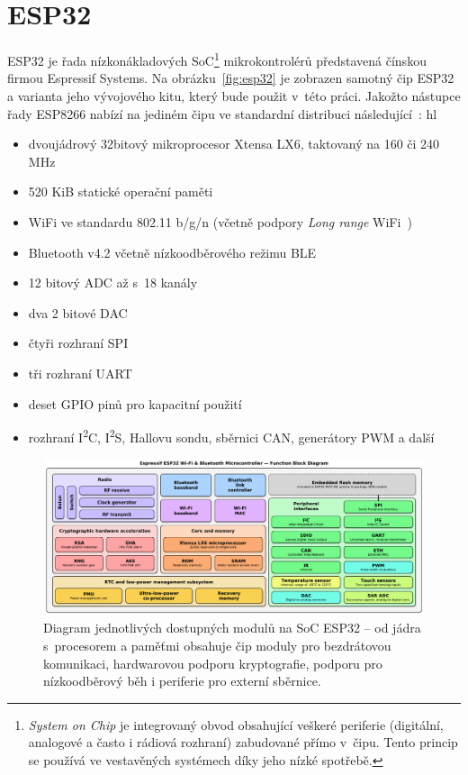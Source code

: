 \section{ESP32}\label{sec:esp32}
ESP32 je řada nízkonákladových SoC\footnote{\textit{System on Chip} je integrovaný obvod obsahující veškeré
periferie (digitální, analogové a často i rádiová rozhraní) zabudované přímo v~čipu.
Tento princip se používá ve vestavěných systémech díky jeho nízké spotřebě.} mikrokontrolérů představená čínskou
firmou Espressif Systems.
Na obrázku~\ref{fig:esp32} je zobrazen samotný čip ESP32 a varianta jeho vývojového kitu, který bude použit v~této
práci.
Jakožto nástupce řady ESP8266 nabízí na jediném čipu ve standardní distribuci následující~\cite{ESP32Datasheet}:
hl
\begin{itemize}
    \item dvoujádrový 32bitový mikroprocesor Xtensa LX6, taktovaný na 160 či 240 MHz
    \item 520 KiB statické operační paměti
    \item WiFi ve standardu 802.11 b/g/n (včetně podpory \textit{Long range} WiFi~\cite{Esp32LongRangeWifi})
    \item Bluetooth v4.2 včetně nízkoodběrového režimu BLE
    \item 12 bitový ADC až s~18 kanály
    \item dva 2 bitové DAC
    \item čtyři rozhraní SPI
    \item tři rozhraní UART
    \item deset GPIO pinů pro kapacitní použití
    \item rozhraní I\textsuperscript{2}C, I\textsuperscript{2}S, Hallovu sondu, sběrnici CAN, generátory PWM a další
\end{itemize}

\begin{figure}
    \centering
    \includegraphics[width=\textwidth]{figures/esp-function-diagram.pdf}

    \caption{Diagram jednotlivých dostupných modulů na SoC ESP32 -- od jádra s~procesorem a paměťmi obsahuje čip
    moduly pro bezdrátovou komunikaci, hardwarovou podporu kryptografie, podporu pro nízkoodběrový běh i periferie
    pro externí sběrnice\protect\footnotemark.}

    \label{fig:esp-diagram}
\end{figure}

